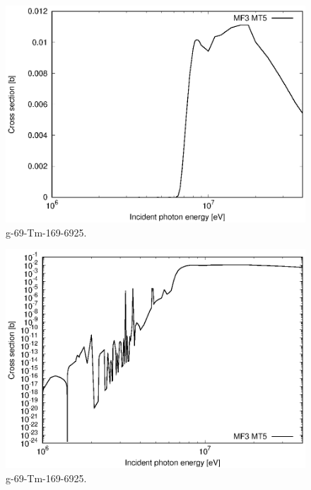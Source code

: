 \begin{figure}
 \includegraphics[width=\linewidth]{eps/g_69-Tm-169_6925.eps}
  \caption{g-69-Tm-169-6925.}
\end{figure}
\begin{figure}
 \includegraphics[width=\linewidth]{eps-log/g_69-Tm-169_6925.eps}
 \caption{g-69-Tm-169-6925.}
\end{figure}
\newpage \clearpage

